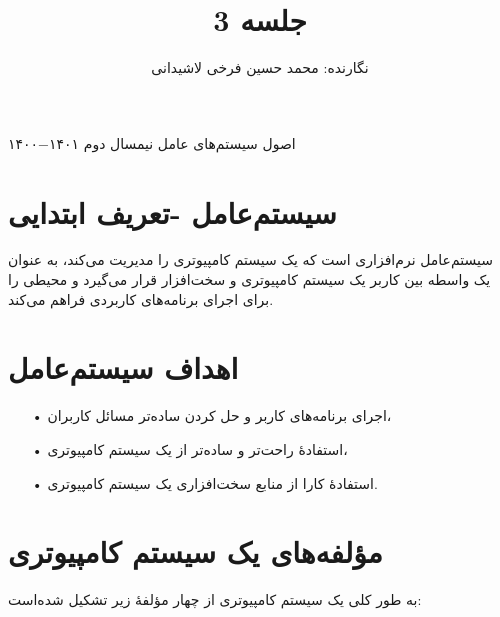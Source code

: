 \documentclass{article}
\title{جلسه 3 }
\author{نگارنده: محمد حسین فرخی لاشیدانی }
\begin{document}
{
	اصول سیستم‌های عامل
}
{
نیمسال دوم ۱۴۰۱−۱۴۰۰
}
\maketitle

\tableofcontents 
\vspace{0.75 cm}



\section{سیستم‌عامل -تعریف ابتدایی}

سیستم‌عامل نرم‌افزاری است که یک سیستم کامپیوتری را مدیریت می‌کند، به عنوان یک واسطه بین کاربر یک سیستم کامپیوتری و سخت‌افزار قرار می‌گیرد و محیطی را برای اجرای برنامه‌های کاربردی فراهم می‌کند.




\section{اهداف سیستم‌عامل}
\begin{enumerate}
    \item[•] اجرای برنامه‌های کاربر و حل کردن ساده‌تر مسائل کاربران،
    \item[•] استفادۀ راحت‌تر و ساده‌تر از یک سیستم کامپیوتری،
    \item[•] استفادۀ کارا از منابع سخت‌افزاری یک سیستم کامپیوتری.
\end{enumerate}



\section{مؤلفه‌های یک سیستم کامپیوتری }

به طور کلی یک سیستم کامپیوتری از چهار مؤلفۀ زیر تشکیل شده‌است:
\end{document}
